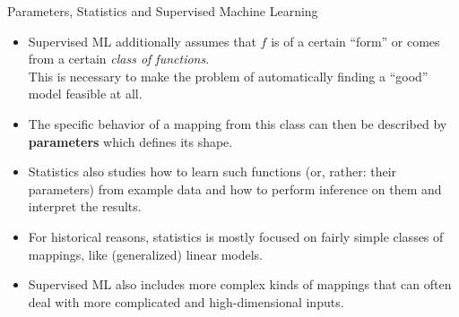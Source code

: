 \begin{vbframe}{Parameters, Statistics and Supervised Machine Learning}

\begin{itemize}
\item Supervised ML additionally assumes that $f$ is of a certain \enquote{form}
or comes from a certain \emph{class of functions}.\\
This is necessary to make the problem of automatically finding a \enquote{good} model feasible at all.
\item The specific behavior of a mapping from this class can then be described by \textbf{parameters} which defines its shape.
\item Statistics also studies how to learn such functions (or, rather: their parameters) from example data and how to perform inference on them and interpret the results.
\item For historical reasons, statistics is mostly focused on fairly simple classes of mappings, like (generalized) linear models.
\item Supervised ML also includes more complex kinds of mappings that can often deal with more complicated and high-dimensional inputs.
\end{itemize}
\end{vbframe}

\endlecture

